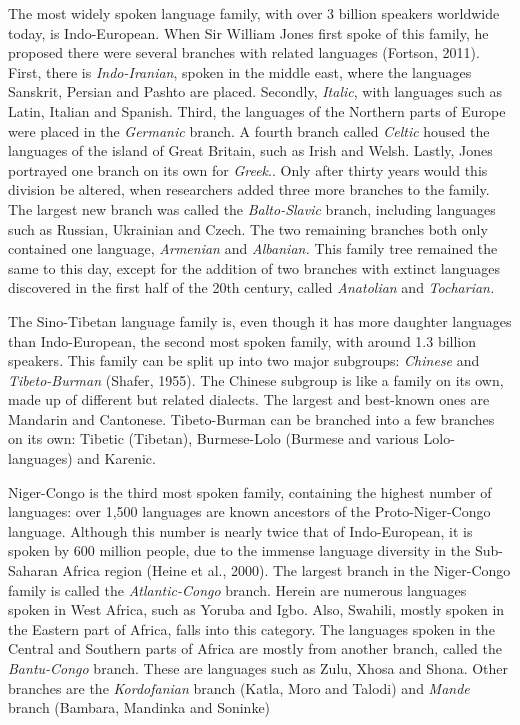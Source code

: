 The most widely spoken language family, with over 3 billion speakers worldwide today, is Indo-European. When Sir William Jones first spoke of this family, he proposed there were several branches with related languages (Fortson, 2011). First, there is \textit{Indo-Iranian}, spoken in the middle east, where the languages Sanskrit, Persian and Pashto are placed. Secondly, \textit{Italic}, with languages such as Latin, Italian and Spanish. Third, the languages of the Northern parts of Europe were placed in the \textit{Germanic} branch. A fourth branch called \textit{Celtic} housed the languages of the island of Great Britain, such as Irish and Welsh. Lastly, Jones portrayed one branch on its own for \textit{Greek}.. Only after thirty years would this division be altered, when researchers added three more branches to the family. The largest new branch was called the \textit{Balto-Slavic} branch, including languages such as Russian, Ukrainian and Czech. The two remaining branches both only contained one language, \textit{Armenian} and \textit{Albanian.} This family tree remained the same to this day, except for the addition of two branches with extinct languages discovered in the first half of the 20th century, called \textit{Anatolian} and \textit{Tocharian.}  

The Sino-Tibetan language family is, even though it has more daughter languages than Indo-European, the second most spoken family, with around 1.3 billion speakers. This family can be split up into two major subgroups: \textit{Chinese} and \textit{Tibeto-Burman}  (Shafer, 1955). The Chinese subgroup is like a family on its own, made up of different but related dialects. The largest and best-known ones are Mandarin and Cantonese. Tibeto-Burman can be branched into a few branches on its own: Tibetic (Tibetan), Burmese-Lolo (Burmese and various Lolo-languages) and Karenic.  

Niger-Congo is the third most spoken family, containing the highest number of languages: over 1,500 languages are known ancestors of the Proto-Niger-Congo language. Although this number is nearly twice that of Indo-European, it is spoken by 600 million people, due to the immense language diversity in the Sub-Saharan Africa region (Heine et al., 2000). The largest branch in the Niger-Congo family is called the \textit{Atlantic-Congo} branch. Herein are numerous languages spoken in West Africa, such as Yoruba and Igbo. Also, Swahili, mostly spoken in the Eastern part of Africa, falls into this category. The languages spoken in the Central and Southern parts of Africa are mostly from another branch, called the \textit{Bantu-Congo} branch. These are languages such as Zulu, Xhosa and Shona. Other branches are the \textit{Kordofanian} branch (Katla, Moro and Talodi) and \textit{Mande} branch (Bambara, Mandinka and Soninke) 

